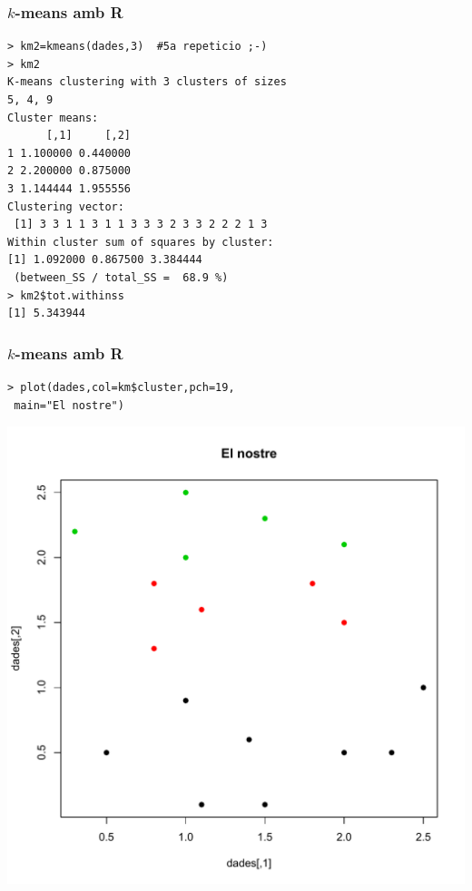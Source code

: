 \documentclass[12pt,t]{beamer}
\theoremstyle{plain}
\theoremstyle{definition}
\begin{document}
\begin{frame}[fragile]
\frametitle{$k$-means amb R}
\vspace*{-2ex}

 
\begin{verbatim}
> km2=kmeans(dades,3)  #5a repeticio ;-) 
> km2
K-means clustering with 3 clusters of sizes
5, 4, 9
Cluster means:
      [,1]     [,2]
1 1.100000 0.440000
2 2.200000 0.875000
3 1.144444 1.955556
Clustering vector:
 [1] 3 3 1 1 3 1 1 3 3 3 2 3 3 2 2 2 1 3
Within cluster sum of squares by cluster:
[1] 1.092000 0.867500 3.384444
 (between_SS / total_SS =  68.9 %)
> km2$tot.withinss
[1] 5.343944
\end{verbatim}
\end{frame}





\begin{frame}[fragile]
\frametitle{$k$-means amb R}

\begin{verbatim}
> plot(dades,col=km$cluster,pch=19,
 main="El nostre")
\end{verbatim}
\vspace*{-3ex}

\begin{center}
\includegraphics[width=0.7 \linewidth]{Rplot5.pdf}
\end{center}

\end{frame}
\end{document}
